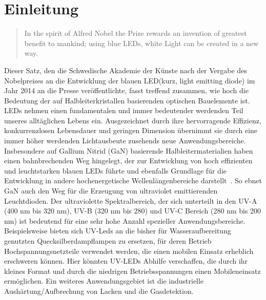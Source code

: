 
\chapter{Einleitung}
\thispagestyle{fancy}

\begin{quote}
In the spirit of Alfred Nobel the Prize rewards an invention of greatest benefit to mankind; using blue LEDs, white Light can be created in a new way.\end{quote}
Dieser Satz, den die Schwedische Akademie der Künste nach der Vergabe des Nobelpreises an die Entwicklung der blauen LED(kurz, light emitting diode) im Jahr 2014 an die Presse veröffentlichte, fasst treffend zusammen, wie hoch die Bedeutung der auf Halbleiterkristallen basierenden optischen Bauelemente ist.
LEDs nehmen einen fundamentalen und immer bedeutender werdenden Teil unseres alltäglichen Lebens ein. Ausgezeichnet durch ihre hervorragende Effizienz, konkurrenzlosen Lebensdauer und geringen Dimension übernimmt sie durch eine immer höher werdenden Lichtausbeute zusehends neue Anwendungsbereiche. 
Insbesondere auf Gallium Nitrid (GaN) basierende Halbleitermaterialien haben einen bahnbrechenden Weg hingelegt, der zur Entwicklung von hoch effizienten und leuchtstarken blauen LEDs führte und ebenfalls Grundlage für die Entwicklung in andere hochenergetische Wellenlängenbereiche darstellt~\cite{risk}.
So ebnet GaN auch den Weg für die Erzeugung von ultraviolet emittierenden Leuchtdioden. Der ultraviolette Spektralbereich, der sich unterteilt in den UV-A (400 nm bis 320 nm), UV-B (320 nm bis 280) und UV-C Bereich (280 nm bis 200 nm) ist bedeutend für eine sehr hohe Anzahl spezieller Anwendungsbereiche. Beispielsweise bieten sich UV-Leds an die bisher für Wasseraufbereitung genutzten Quecksilberdampflampen zu ersetzen, für deren Betrieb Hochspannungsnetzteile verwendet werden, die einen mobilen Einsatz erheblich erschweren können. Hier könnten UV-LEDs Abhilfe verschaffen, die durch ihr kleines Format und durch die niedrigen Betriebsspannungen einen Mobileneinsatz ermöglichen. Ein weiteres Anwendungsgebiet ist die industrielle Aushärtung/Aufbrechung von Lacken und die Gasdetektion. 
\newline
